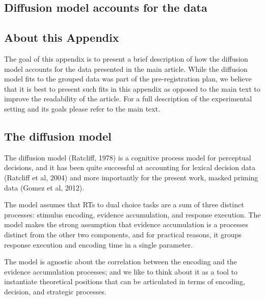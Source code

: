 \clearpage



\begin{appendix}
\hypertarget{diffusion-model-accounts-for-the-data}{%
\section{Diffusion model accounts for the
data}\label{diffusion-model-accounts-for-the-data}}

\hypertarget{about-this-appendix}{%
\subsection{About this Appendix}\label{about-this-appendix}}

The goal of this appendix is to present a brief description of how the
diffusion model accounts for the data presented in the main article.
While the diffusion model fits to the grouped data was part of the
pre-registration plan, we believe that it is best to present such fits
in this appendix as opposed to the main text to improve the readability
of the article. For a full description of the experimental setting and
its goals please refer to the main text.

\hypertarget{the-diffusion-model}{%
\subsection{The diffusion model}\label{the-diffusion-model}}

The diffusion model (Ratcliff, 1978) is a cognitive process model for
perceptual decisions, and it has been quite successful at accounting for
lexical decision data (Ratcliff et al, 2004) and more importantly for
the present work, masked priming data (Gomez et al, 2012).

The model assumes that RTs to dual choice tasks are a sum of three
distinct processes: stimulus encoding, evidence accumulation, and
response execution. The model makes the strong assumption that evidence
accumulation is a processes distinct from the other two components, and
for practical reasons, it groups response execution and encoding time in
a single parameter.

The model is agnostic about the correlation between the encoding and the
evidence accumulation processes; and we like to think about it as a tool
to instantiate theoretical positions that can be articulated in terms of
encoding, decision, and strategic processes.


\end{appendix}

